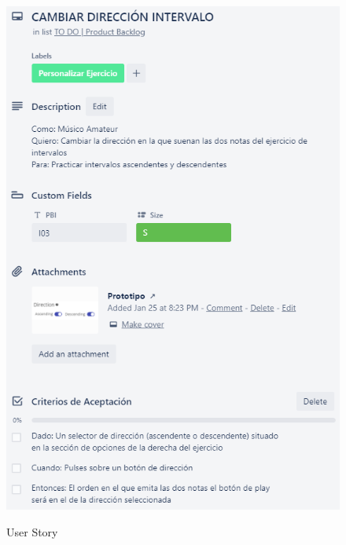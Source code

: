 \documentclass[12pt,twoside,titlepage]{report}
\begin{document}
{\begin{figure}[H]
    \centering
    \includegraphics[scale=1.3]{Scrum/User Stories/IntervalosDireccion}
    \label{fig:IntervalosDireccion}
    \caption{User Story}
\end{figure}

}
\end{document}
